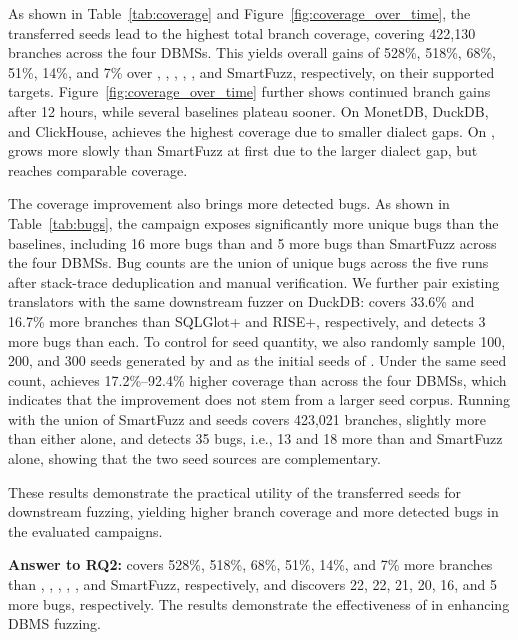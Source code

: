 \documentclass[conference]{IEEEtran}
\begin{document}
As shown in Table~\ref{tab:coverage} and Figure~\ref{fig:coverage_over_time}, the transferred seeds lead to the highest total branch coverage, covering 422,130 branches across the four DBMSs.
This yields overall gains of 528\%, 518\%, 68\%, 51\%, 14\%, and 7\% over \sqlancer{}, \sqlright{}, \squirrel{}, \griffin{}, \sedar{}, and SmartFuzz, respectively, on their supported targets.
Figure~\ref{fig:coverage_over_time} further shows continued branch gains after 12 hours, while several baselines plateau sooner. On MonetDB, DuckDB, and ClickHouse, \tool{} achieves the highest coverage due to smaller dialect gaps. On \virtuoso{}, \tool{} grows more slowly than SmartFuzz at first due to the larger dialect gap, but reaches comparable coverage.





The coverage improvement also brings more detected bugs.
As shown in Table~\ref{tab:bugs}, the campaign exposes significantly more unique bugs than the baselines, including 16 more bugs than \sedar{} and 5 more bugs than SmartFuzz across the four DBMSs. 
Bug counts are the union of unique bugs across the five runs after stack-trace deduplication and manual verification.
We further pair existing translators with the same downstream fuzzer on DuckDB: \tool{} covers 33.6\% and 16.7\% more branches than SQLGlot+\griffin{} and RISE+\griffin{}, respectively, and detects 3 more bugs than each.
To control for seed quantity, we also randomly sample 100, 200, and 300 seeds generated by \tool{} and \sedar{} as the initial seeds of \griffin{}.
Under the same seed count, \tool{} achieves 17.2\%--92.4\% higher coverage than \sedar{} across the four DBMSs, which indicates that the improvement does not stem from a larger seed corpus.
Running \griffin{} with the union of SmartFuzz and \tool{} seeds covers 423,021 branches, slightly more than either alone, and detects 35 bugs, i.e., 13 and 18 more than \tool{} and SmartFuzz alone, showing that the two seed sources are complementary.

These results demonstrate the practical utility of the transferred seeds for downstream fuzzing, yielding higher branch coverage and more detected bugs in the evaluated campaigns.




\begin{answerbox}
\textbf{Answer to RQ2:} \tool{} covers 528\%, 518\%, 68\%, 51\%, 14\%, and 7\% more branches than \sqlancer{}, \sqlright{}, \squirrel{}, \griffin{}, \sedar{}, and SmartFuzz, respectively, and discovers 22, 22, 21, 20, 16, and 5 more bugs, respectively. 
The results demonstrate the effectiveness of \tool{} in enhancing DBMS fuzzing.
\end{answerbox}
\end{document}
